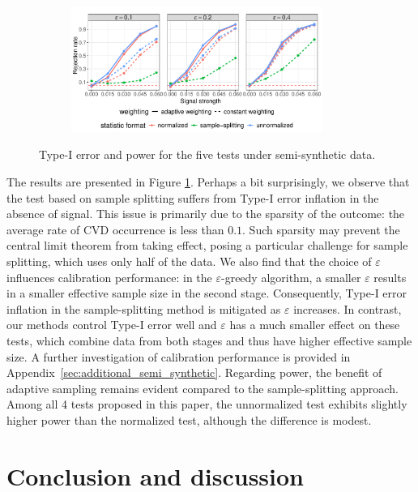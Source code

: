 \documentclass[12pt]{article}
\begin{document}
\begin{figure}[!ht]
	\centering  
	\begin{subfigure}{\textwidth}
	  \centering
	  \includegraphics[width=0.9\textwidth]{figures-and-tables/realdata/rejection_plot.pdf}
	\end{subfigure}
	\caption{Type-I error and power for the five tests under semi-synthetic data. }
	\label{fig:semi-synthetic-data}
\end{figure}

The results are presented in Figure \ref{fig:semi-synthetic-data}. Perhaps a bit surprisingly, we observe that the test based on sample splitting suffers from Type-I error inflation in the absence of signal. This issue is primarily due to the sparsity of the outcome: the average rate of CVD occurrence is less than $0.1$. Such sparsity may prevent the central limit theorem from taking effect, posing a particular challenge for sample splitting, which uses only half of the data. We also find that the choice of $\varepsilon$ influences calibration performance: in the $\varepsilon$-greedy algorithm, a smaller $\varepsilon$ results in a smaller effective sample size in the second stage. Consequently, Type-I error inflation in the sample-splitting method is mitigated as $\varepsilon$ increases. In contrast, our methods control Type-I error well and $\varepsilon$ has a much smaller effect on these tests, which combine data from both stages and thus have higher effective sample size. A further investigation of calibration performance is provided in Appendix~\ref{sec:additional_semi_synthetic}. Regarding power, the benefit of adaptive sampling remains evident compared to the sample-splitting approach. Among all 4 tests proposed in this paper, the unnormalized test exhibits slightly higher power than the normalized test, although the difference is modest.

\section{Conclusion and discussion}\label{sec:discussion}
\end{document}
